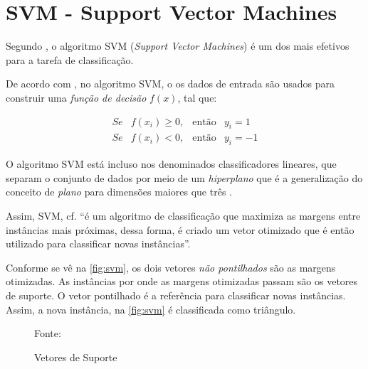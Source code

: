 \section{SVM - Support Vector Machines}\label{SVM}
Segundo , o algoritmo SVM (\textit{Support Vector Machines}) é um dos mais efetivos para a tarefa de classificação.

De acordo com , no algoritmo SVM, o os dados de entrada são usados para construir uma \textit{função de decisão} $f(x)$, tal que:	

\begin{equation}
	\begin{matrix}
		Se & f(x_i) \ge 0, &\textrm{então}&  y_i = 1   \\
		Se & f(x_i) < 0,   &\textrm{então}&  y_i = -1   
	\end{matrix}
\end{equation}

O algoritmo SVM está incluso nos denominados classificadores lineares, que separam o conjunto de dados por meio de um \textit{hiperplano} que é a generalização do conceito de \textit{plano} para dimensões maiores que três \cite{goldschmidt2005}.

Assim, SVM, cf.  ``é um algoritmo de classificação que maximiza as margens entre instâncias mais próximas, dessa forma, é criado um vetor otimizado que é então utilizado para classificar novas instâncias''.

Conforme se vê na \autoref{fig:svm}, os dois vetores \textit{não pontilhados} são as margens otimizadas. As instâncias por onde as margens otimizadas passam são os vetores de suporte. O vetor pontilhado é a referência para classificar novas instâncias. Assim, a nova instância, na \autoref{fig:svm} é classificada como triângulo.

\begin{figure}[h!]
	\centering
	\caption{Vetores de Suporte}
	
	\label{fig:svm}
	{\scriptsize 	Fonte: }
\end{figure}

